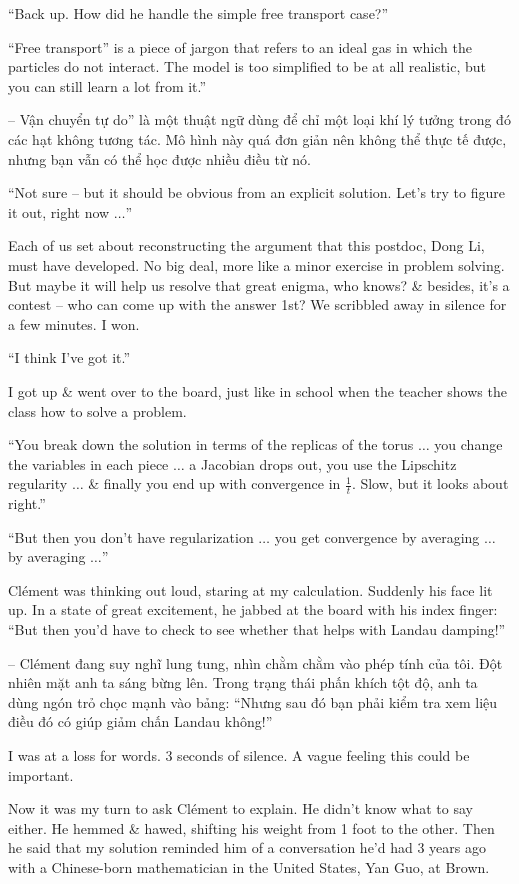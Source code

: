 \documentclass{article}
\begin{document}
\begin{enumerate}
	``Back up. How did he handle the simple free transport case?''
	
	``Free transport'' is a piece of jargon that refers to an ideal gas in which the particles do not interact. The model is too simplified to be at all realistic, but you can still learn a lot from it.''
	
	-- Vận chuyển tự do'' là một thuật ngữ dùng để chỉ một loại khí lý tưởng trong đó các hạt không tương tác. Mô hình này quá đơn giản nên không thể thực tế được, nhưng bạn vẫn có thể học được nhiều điều từ nó.
	
	``Not sure -- but it should be obvious from an explicit solution. Let's try to figure it out, right now $\ldots$''
	
	Each of us set about reconstructing the argument that this postdoc, Dong Li, must have developed. No big deal, more like a minor exercise in problem solving. But maybe it will help us resolve that great enigma, who knows? \& besides, it's a contest -- who can come up with the answer 1st? We scribbled away in silence for a few minutes. I won.
	
	``I think I've got it.''
	
	I got up \& went over to the board, just like in school when the teacher shows the class how to solve a problem.
	
	``You break down the solution in terms of the replicas of the torus $\ldots$ you change the variables in each piece $\ldots$ a Jacobian drops out, you use the Lipschitz regularity $\ldots$ \& finally you end up with convergence in $\frac{1}{t}$. Slow, but it looks about right.''
	
	``But then you don't have regularization $\ldots$ you get convergence by averaging $\ldots$ by averaging $\ldots$''
	
	Cl\'ement was thinking out loud, staring at my calculation. Suddenly his face lit up. In a state of great excitement, he jabbed at the board with his index finger: ``But then you'd have to check to see whether that helps with Landau damping!''
	
	-- Cl\'ement đang suy nghĩ lung tung, nhìn chằm chằm vào phép tính của tôi. Đột nhiên mặt anh ta sáng bừng lên. Trong trạng thái phấn khích tột độ, anh ta dùng ngón trỏ chọc mạnh vào bảng: ``Nhưng sau đó bạn phải kiểm tra xem liệu điều đó có giúp giảm chấn Landau không!''
	
	I was at a loss for words. 3 seconds of silence. A vague feeling this could be important.
	
	Now it was my turn to ask Cl\'ement to explain. He didn't know what to say either. He hemmed \& hawed, shifting his weight from 1 foot to the other. Then he said that my solution reminded him of a conversation he'd had 3 years ago with a Chinese-born mathematician in the United States, Yan Guo, at Brown.
	

\end{enumerate}
\end{document}
